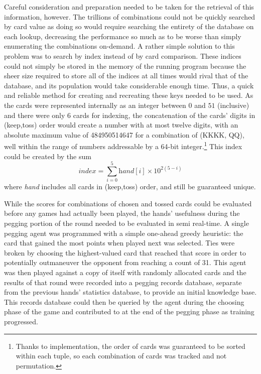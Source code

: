 Careful consideration and preparation needed to be taken
for the retrieval of this information, however.
%
The trillions of combinations could not be quickly searched by card value as
doing so would require searching the entirety of the database on each lookup,
decreasing the performance so much as to be worse than simply
enumerating the combinations on-demand.
%
A rather simple solution to this problem was to search by index
instead of by card comparison.
%
These indices could not simply be stored in the memory of the running program
because the sheer size required to store all of the indices at all times
would rival that of the database,
and its population would take considerable enough time.
%
Thus, a quick and reliable method for creating and recreating these keys
needed to be used.
%
As the cards were represented internally as an integer between $0$ and $51$
(inclusive)
and there were only 6 cards for indexing,
the concatenation of the cards' digits in (keep,toss) order
would create a number with at most twelve digits,
with an absolute maximum value of 484950514647
for a combination of
(K\spades K\clubs K\hearts K\diamonds, Q\hearts Q\diamonds),
well within the range of numbers addressable by a 64-bit integer.\footnote{
	Thanks to implementation,
	the order of cards was guaranteed to be sorted within each tuple,
	so each combination of cards was tracked and not permutation.
}
%
This index could be created by the sum
\[
	\textit{index} = \sum_{i=0}^{5} { \textit{hand}[i] \times 10^{2(5-i)} }
\]
where \textit{hand} includes all cards in (keep,toss) order,
and still be guaranteed unique.

While the scores for combinations of chosen and tossed cards could be evaluated 
before any games had actually been played,
the hands' usefulness during the pegging portion of the round needed to be
evaluated in semi real-time.
%
A single pegging agent was programmed with a simple one-ahead greedy heuristic:
the card that gained the most points when played next was selected.
%
Ties were
broken by choosing the highest-valued card that reached that score
in order to potentially outmaneuver the opponent from reaching a count of 31.
%
This agent was then played against a copy of itself with randomly allocated
cards and the results of that round were recorded
into a pegging records database,
separate from the previous hands' statistics database,
to provide an initial knowledge base.
%
This records database could then be queried by the agent during the choosing phase of the
game and contributed to at the end of the pegging phase as training progressed.

